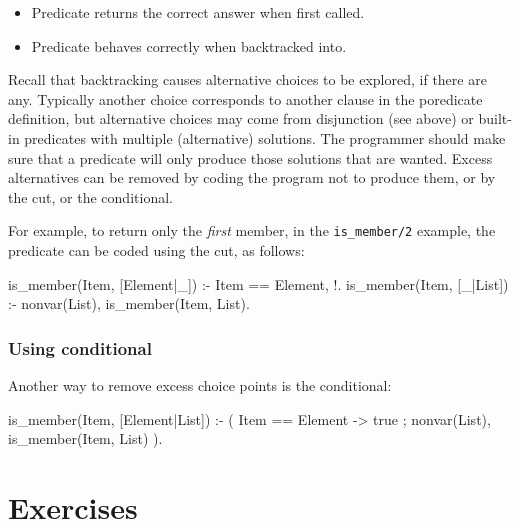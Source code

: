 \begin{itemize}
\item Predicate returns the correct answer when first called.
\item Predicate behaves correctly when backtracked into.
\end{itemize}

Recall that backtracking causes alternative choices to be explored, if
there are any.  Typically another choice corresponds to another clause
in the poredicate definition, but alternative choices may come from
disjunction (see above) or built-in predicates with multiple
(alternative) solutions. 
The programmer should make sure that a predicate will only produce
those solutions that are wanted. Excess alternatives can be removed by
coding the program not to produce them, or by the cut, or the conditional.

For example, to return only the {\it first\/} member, in the
\verb'is_member/2' example, 
the predicate can be coded using the cut, as follows:

\begin{code}
is_member(Item, [Element|_]) :- Item == Element, !.
is_member(Item, [_|List]) :- nonvar(List), is_member(Item, List).
\end{code}

\subsubsection{Using conditional}

Another way to remove excess choice points is the conditional:

\begin{code}
is_member(Item, [Element|List]) :- 
    ( Item == Element ->
        true 
    ;
        nonvar(List), is_member(Item, List)
    ).
\end{code}


\section{Exercises}

